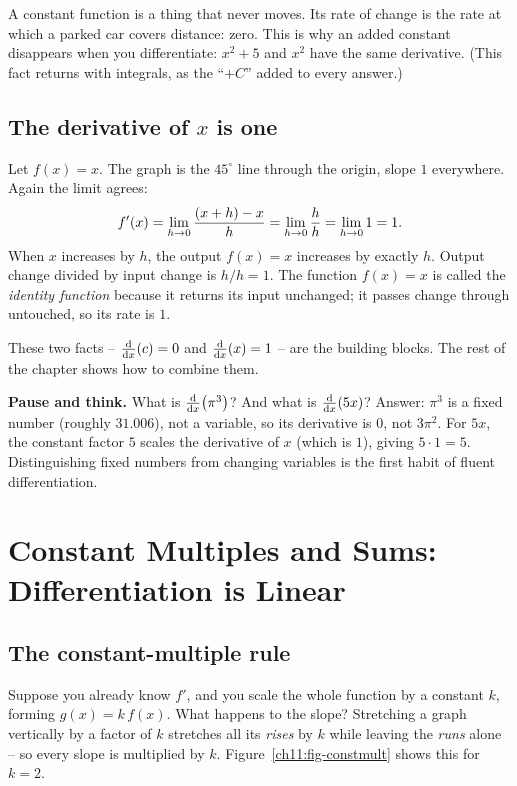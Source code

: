 \begin{intuitionbox}
A constant function is a thing that never moves. Its rate of change is the rate at which
a parked car covers distance: zero. This is why an added constant disappears when you
differentiate: $x^2+5$ and $x^2$ have the same derivative. (This fact returns with
integrals, as the ``$+C$'' added to every answer.)
\end{intuitionbox}

\subsection{The derivative of $x$ is one}

Let $f(x)=x$. The graph is the $45^\circ$ line through the origin, slope $1$ everywhere.
Again the limit agrees:
\[
  f'(x) = \lim_{h\to 0}\frac{(x+h)-x}{h}
        = \lim_{h\to 0}\frac{h}{h}
        = \lim_{h\to 0} 1 = 1.
\]
When $x$ increases by $h$, the output $f(x)=x$ increases by exactly $h$. Output change
divided by input change is $h/h = 1$. The function $f(x)=x$ is called the
\emph{identity function} because it returns its input unchanged; it passes change
through untouched, so its rate is $1$.

These two facts -- $\frac{\mathrm{d}}{\mathrm{d} x}\!\left(c\right)=0$ and $\frac{\mathrm{d}}{\mathrm{d} x}\!\left(x\right)=1$ -- are the building blocks. The rest of
the chapter shows how to combine them.

\begin{recoverybox}
\textbf{Pause and think.} What is $\frac{\mathrm{d}}{\mathrm{d} x}\!\left(\pi^3\right)$? And what is $\frac{\mathrm{d}}{\mathrm{d} x}\!\left(5x\right)$?
Answer: $\pi^3$ is a fixed number (roughly $31.006$), not a variable,
so its derivative is $0$, not $3\pi^2$. For $5x$, the constant factor $5$ scales the
derivative of $x$ (which is $1$), giving $5\cdot 1 = 5$. Distinguishing fixed numbers
from changing variables is the first habit of fluent differentiation.
\end{recoverybox}

\section{Constant Multiples and Sums: Differentiation is Linear}
\label{ch11:linearity}

\subsection{The constant-multiple rule}

Suppose you already know $f'$, and you scale the whole function by a constant $k$, forming
$g(x)=k\,f(x)$. What happens to the slope? Stretching a graph vertically by a factor of
$k$ stretches all its \emph{rises} by $k$ while leaving the \emph{runs} alone -- so every
slope is multiplied by $k$. Figure~\ref{ch11:fig-constmult} shows this for $k=2$.

